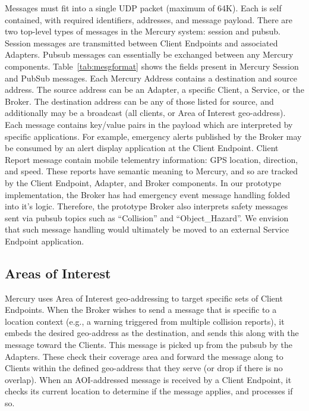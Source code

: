 Messages must fit into a single UDP packet (maximum of 64K).  Each is
self contained, with required identifiers, addresses, and message
payload.  There are two top-level types of messages in the Mercury
system: session and pubsub.  Session messages are transmitted between
Client Endpoints and associated Adapters.  Pubsub messages can
essentially be exchanged between any Mercury components.
Table~\ref{tab:mesgformat} shows the fields present in Mercury Session
and PubSub messages. Each Mercury Address contains a destination and
source address.  The source address can be an Adapter, a specific
Client, a Service, or the Broker.  The destination address can be any
of those listed for source, and additionally may be a broadcast (all
clients, or Area of Interest geo-address).  Each message contains
key/value pairs in the payload which are interpreted by specific
applications. For example, emergency alerts published by the Broker
may be consumed by an alert display application at the Client
Endpoint.  Client Report message contain mobile telementry
information: GPS location, direction, and speed. These reports have
semantic meaning to Mercury, and so are tracked by the Client
Endpoint, Adapter, and Broker components.  In our prototype
implementation, the Broker has had emergency event message handling
folded into it's logic.  Therefore, the prototype Broker also
interprets safety messages sent via pubsub topics such as
``Collision'' and ``Object\_Hazard''. We envision that such message
handling would ultimately be moved to an external Service Endpoint
application.

\subsection{Areas of Interest}

Mercury uses Area of Interest geo-addressing to target specific sets
of Client Endpoints.  When the Broker wishes to send a message that is
specific to a location context (e.g., a warning triggered from
multiple collision reports), it embeds the desired geo-address as the
destination, and sends this along with the message toward the
Clients. This message is picked up from the pubsub by the Adapters.
These check their coverage area and forward the message along to
Clients within the defined geo-address that they serve (or drop if
there is no overlap).  When an AOI-addressed message is received by a
Client Endpoint, it checks its current location to determine if the
message applies, and processes if so.

